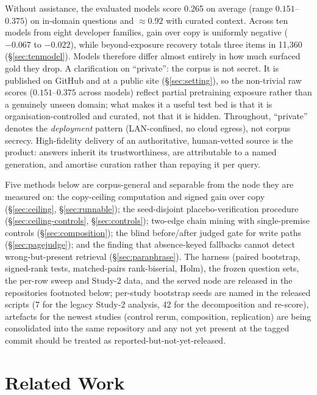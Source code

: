 \documentclass[10pt,twocolumn]{article}
\begin{document}
Without assistance, the evaluated models score 0.265 on average (range $0.151$--$0.375$) on in-domain questions and $\approx0.92$ with curated context. Across ten models from eight developer families, gain over copy is uniformly negative ($-0.067$ to $-0.022$), while beyond-exposure recovery totals three items in 11{,}360 (\S\ref{sec:tenmodel}). Models therefore differ almost entirely in how much surfaced gold they drop. A clarification on ``private'': the corpus is not secret. It is published on GitHub and at a public site (\S\ref{sec:setting}), so the non-trivial raw scores ($0.151$--$0.375$ across models) reflect partial pretraining exposure rather than a genuinely unseen domain; what makes it a useful test bed is that it is organisation-controlled and curated, not that it is hidden. Throughout, ``private'' denotes the \emph{deployment} pattern (LAN-confined, no cloud egress), not corpus secrecy. High-fidelity delivery of an authoritative, human-vetted source is the product: answers inherit its trustworthiness, are attributable to a named generation, and amortise curation rather than repaying it per query.

Five methods below are corpus-general and separable from the node they are measured on: the copy-ceiling computation and signed gain over copy (\S\ref{sec:ceiling}, \S\ref{sec:runnable}); the seed-disjoint placebo-verification procedure (\S\ref{sec:ceiling-controls}, \S\ref{sec:controls}); two-edge chain mining with single-premise controls (\S\ref{sec:composition}); the blind before/after judged gate for write paths (\S\ref{sec:pagejudge}); and the finding that absence-keyed fallbacks cannot detect wrong-but-present retrieval (\S\ref{sec:paraphrase}). The harness (paired bootstrap, signed-rank tests, matched-pairs rank-biserial, Holm), the frozen question sets, the per-row sweep and Study-2 data, and the served node are released in the repositories footnoted below; per-study bootstrap seeds are named in the released scripts (7 for the legacy Study-2 analysis, 42 for the decomposition and re-score), artefacts for the newest studies (control rerun, composition, replication) are being consolidated into the same repository and any not yet present at the tagged commit should be treated as reported-but-not-yet-released.


\section{Related Work}\label{sec:related}
\end{document}
